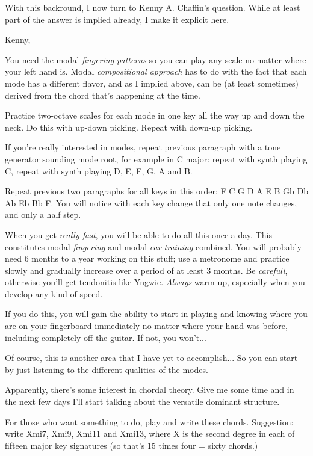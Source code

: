 With this backround, I now turn to Kenny A. Chaffin's question. While at least
part of the answer is implied already, I make it explicit here.

Kenny,

You need the modal \emph{fingering patterns} so you can play any scale no matter
where your left hand is. Modal \emph{compositional approach} has to do with the
fact that each mode has a different flavor, and as I implied above, can be
(at least sometimes) derived from the chord that's happening at the time.

Practice two-octave scales for each mode in one key all the way up and down
the neck. Do this with up-down picking. Repeat with down-up picking.

If you're really interested in modes, repeat previous paragraph with
a tone generator sounding mode root, for example in C major: repeat with
synth playing C, repeat with synth playing D, E, F, G, A and B.

Repeat previous two paragraphs for all keys in this order: F C G D A
E B Gb Db Ab Eb Bb F. You will notice with each key change that only one note
changes, and only a half step.

When you get \emph{really fast}, you will be able to do all this once a day.
This constitutes modal \emph{fingering} and modal \emph{ear training} combined.
You will probably need 6 months to a year working on this stuff; use
a metronome and practice slowly and gradually increase over a period
of at least 3 months. Be \emph{carefull}, otherwise you'll get tendonitis
like Yngwie. \emph{Always} warm up, especially when you develop any kind of
speed.

If you do this, you will gain the ability to start in playing and knowing
where you are on your fingerboard immediately no matter where your hand
was before, including completely off the guitar. If not, you won't...

Of course, this is another area that I have yet to accomplish... So
you can start by just listening to the different qualities of the
modes.

Apparently, there's some interest in chordal theory. Give me some time and
in the next few days I'll start talking about the versatile dominant structure.

For those who want something to do, play and write these chords. Suggestion:
write Xmi7, Xmi9, Xmi11 and Xmi13, where X is the second degree in each of
fifteen major key signatures (so that's 15 times four = sixty chords.)

